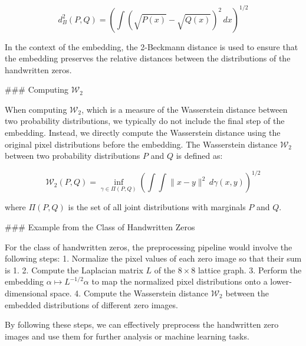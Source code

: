 \[
d_B^2(P, Q) = \left( \int \left( \sqrt{P(x)} - \sqrt{Q(x)} \right)^2 \, dx \right)^{1/2}
\]

In the context of the embedding, the 2-Beckmann distance is used to ensure that the embedding preserves the relative distances between the distributions of the handwritten zeros.

### Computing \(\mathcal{W}_2\)

When computing \(\mathcal{W}_2\), which is a measure of the Wasserstein distance between two probability distributions, we typically do not include the final step of the embedding. Instead, we directly compute the Wasserstein distance using the original pixel distributions before the embedding. The Wasserstein distance \(\mathcal{W}_2\) between two probability distributions \(P\) and \(Q\) is defined as:

\[
\mathcal{W}_2(P, Q) = \inf_{\gamma \in \Pi(P, Q)} \left( \int \int \|x - y\|^2 \, d\gamma(x, y) \right)^{1/2}
\]

where \(\Pi(P, Q)\) is the set of all joint distributions with marginals \(P\) and \(Q\).

### Example from the Class of Handwritten Zeros

For the class of handwritten zeros, the preprocessing pipeline would involve the following steps:
1. Normalize the pixel values of each zero image so that their sum is 1.
2. Compute the Laplacian matrix \(L\) of the \(8 \times 8\) lattice graph.
3. Perform the embedding \(\alpha \mapsto L^{-1/2} \alpha\) to map the normalized pixel distributions onto a lower-dimensional space.
4. Compute the Wasserstein distance \(\mathcal{W}_2\) between the embedded distributions of different zero images.

By following these steps, we can effectively preprocess the handwritten zero images and use them for further analysis or machine learning tasks.